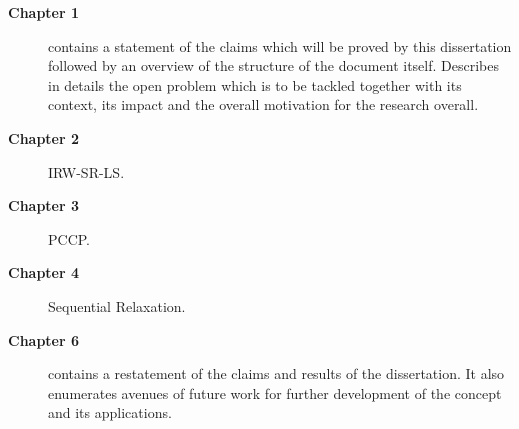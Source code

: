 \begin{description}
\item[\textbf{Chapter 1}] contains a statement of
the claims which will be proved by this dissertation followed by an overview of the structure of the document itself. Describes in details the open problem which is to be tackled together with its context, its impact and the overall motivation for the research overall.
\item[\textbf{Chapter 2}] IRW-SR-LS.
\item[\textbf{Chapter 3}] PCCP.
\item[\textbf{Chapter 4}] Sequential Relaxation.
\item[\textbf{Chapter 6}] contains a restatement of the claims and results of the dissertation. It also enumerates avenues of future work for further development of the concept and its applications.
\end{description}